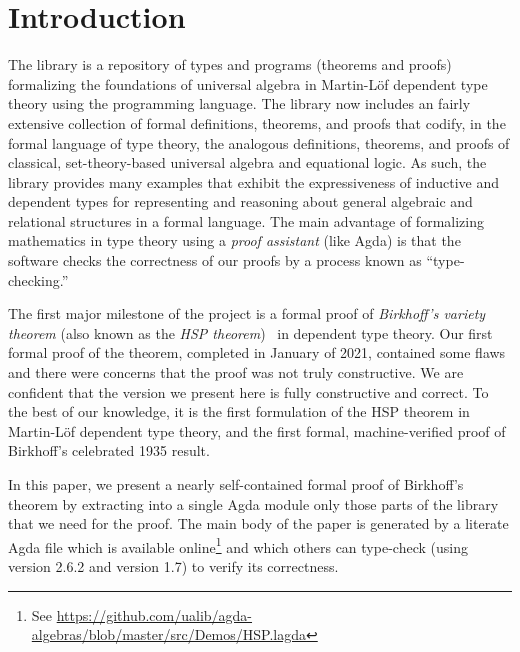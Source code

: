 \section{Introduction}
The \agdaalgebras library is a repository of types and programs
(theorems and proofs) formalizing the foundations of universal algebra in Martin-Löf dependent type
theory using the \agda programming language.
The library now includes an fairly extensive collection of formal definitions, theorems, and
proofs that codify, in the formal language of type theory, the analogous definitions,
theorems, and proofs of classical, set-theory-based universal algebra and equational
logic. As such, the \agdaalgebras library provides many examples that exhibit the
expressiveness of inductive and dependent types for representing and reasoning about
general algebraic and relational structures in a formal language. The main advantage of
formalizing mathematics in type theory using a \emph{proof assistant} (like Agda) is that
the software checks the correctness of our proofs by a process known as ``type-checking.''

The first major milestone of the \agdaalgebras project is a formal proof of \emph{Birkhoff's
variety theorem} (also known as the \emph{HSP theorem})~\cite{Birkhoff:1935} in dependent
type theory. Our first formal proof of the theorem, completed in January of 2021,
contained some flaws and there were concerns that the proof was not truly
constructive.
We are confident that the version we present here is fully constructive and correct. To the
best of our knowledge, it is the first formulation of the HSP theorem in Martin-Löf
dependent type theory, and the first formal, machine-verified proof of Birkhoff's
celebrated 1935 result.

In this paper, we present a nearly self-contained formal proof of Birkhoff's theorem by
extracting into a single Agda module only those parts of the \agdaalgebras library that we
need for the proof.  The main body of the paper is generated by a literate Agda file which
is available online\footnote{See
\url{https://github.com/ualib/agda-algebras/blob/master/src/Demos/HSP.lagda}}
and which others can type-check (using \agda version 2.6.2 and \agdastdlib version 1.7) to
verify its correctness.
\ifshort

